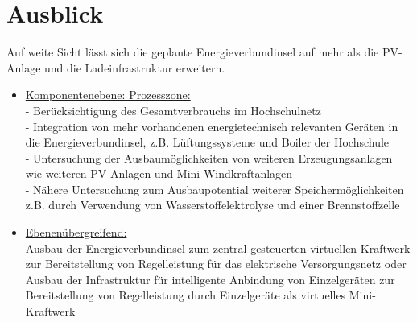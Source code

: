 \section{Ausblick}
\label{Kap:Perspektive}
	Auf weite Sicht lässt sich die geplante Energieverbundinsel auf mehr als die PV-Anlage und die Ladeinfrastruktur erweitern. 
	\begin{itemize}
        \item \underline{Komponentenebene: Prozesszone:} \\
        	- Berücksichtigung des Gesamtverbrauchs im Hochschulnetz \\
        	- Integration von mehr vorhandenen energietechnisch relevanten Geräten in die Energieverbundinsel, z.B. Lüftungssysteme und Boiler der Hochschule\\
        	- Untersuchung der Ausbaumöglichkeiten von weiteren Erzeugungsanlagen wie weiteren PV-Anlagen und Mini-Windkraftanlagen \\
        	- Nähere Untersuchung zum Ausbaupotential weiterer Speichermöglichkeiten z.B. durch Verwendung von Wasserstoffelektrolyse und einer Brennstoffzelle
        \item \underline{Ebenenübergreifend:} \\ 
        	Ausbau der Energieverbundinsel zum zentral gesteuerten virtuellen Kraftwerk zur Bereitstellung von Regelleistung für das elektrische Versorgungsnetz oder Ausbau der Infrastruktur für intelligente Anbindung von Einzelgeräten zur Bereitstellung von Regelleistung durch Einzelgeräte als virtuelles Mini-Kraftwerk 
	\end{itemize}
    
